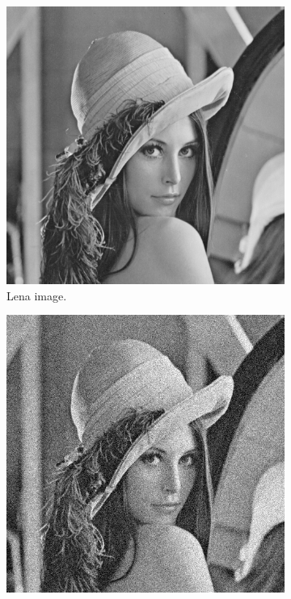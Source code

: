 \documentclass[abstracton]{scrreprt}
\begin{document}
            \begin{figure}[!ht]
                \centering
                \begin{subfigure}[b]{0.24\textwidth}
                    \includegraphics[width=\textwidth]{img/images/lena.png}
                    \caption{Lena image.}
                \end{subfigure}
                \begin{subfigure}[b]{0.24\textwidth}
                    \includegraphics[width=\textwidth]{img/images/lena_gauss_noise.png}

\end{subfigure}
\end{figure}
\end{document}
